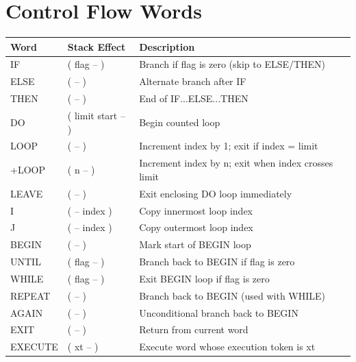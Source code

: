 \section*{Control Flow Words}
\begin{longtable}{>{\ttfamily}lp{4.5cm}p{7cm}}
\toprule
\normalfont Word & Stack Effect & Description \\
\midrule
\endhead
\bottomrule
\endfoot
IF      & ( flag -- )         & Branch if flag is zero (skip to ELSE/THEN) \\
ELSE    & ( -- )              & Alternate branch after IF \\
THEN    & ( -- )              & End of IF...ELSE...THEN \\
DO      & ( limit start -- )  & Begin counted loop \\
LOOP    & ( -- )              & Increment index by 1; exit if index = limit \\
+LOOP   & ( n -- )            & Increment index by n; exit when index crosses limit \\
LEAVE   & ( -- )              & Exit enclosing DO loop immediately \\
I       & ( -- index )        & Copy innermost loop index \\
J       & ( -- index )        & Copy outermost loop index \\
BEGIN   & ( -- )              & Mark start of BEGIN loop \\
UNTIL   & ( flag -- )         & Branch back to BEGIN if flag is zero \\
WHILE   & ( flag -- )         & Exit BEGIN loop if flag is zero \\
REPEAT  & ( -- )              & Branch back to BEGIN (used with WHILE) \\
AGAIN   & ( -- )              & Unconditional branch back to BEGIN \\
EXIT    & ( -- )              & Return from current word \\
EXECUTE & ( xt -- )           & Execute word whose execution token is xt \\
\end{longtable}

